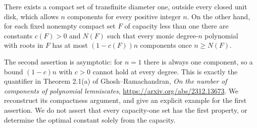 There exists a compact set of transfinite diameter one, outside every closed unit disk, which allows $n$ components for every positive integer $n$. On the other hand, for each fixed nonempty compact set $F$ of capacity less than one there are constants $c(F)>0$ and $N(F)$ such that every monic degree-$n$ polynomial with roots in $F$ has at most $(1-c(F))n$ components once $n\ge N(F)$.

The second assertion is asymptotic: for $n=1$ there is always one component, so a bound $(1-c)n$ with $c>0$ cannot hold at every degree. This is exactly the quantifier in Theorem 2.1(a) of Ghosh--Ramachandran, \emph{On the number of components of polynomial lemniscates}, \url{https://arxiv.org/abs/2312.13673}. We reconstruct its compactness argument, and give an explicit example for the first assertion. We do not assert that every capacity-one set has the first property, or determine the optimal constant solely from the capacity.
